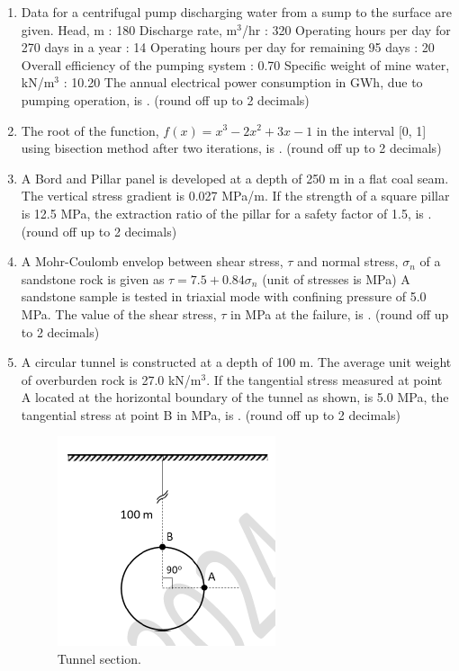 \documentclass[journal]{IEEEtran}
\begin{document}
\begin{enumerate}[leftmargin=0pt]
\hfill{}
\item Data for a centrifugal pump discharging water from a sump to the surface are given. Head, m : 180 Discharge rate, m$^3$/hr : 320 Operating hours per day for 270 days in a year : 14 Operating hours per day for remaining 95 days : 20 Overall efficiency of the pumping system : 0.70 Specific weight of mine water, kN/m$^3$ : 10.20 The annual electrical power consumption in GWh, due to pumping operation, is \underline{\hspace{1.5cm}}. (round off up to 2 decimals)
\hfill{}
\item The root of the function, $f(x) = x^3 - 2x^2 + 3x - 1$ in the interval [0, 1] using bisection method after two iterations, is \underline{\hspace{1.5cm}}. (round off up to 2 decimals)
\hfill{}
\item A Bord and Pillar panel is developed at a depth of 250 m in a flat coal seam. The vertical stress gradient is 0.027 MPa/m. If the strength of a square pillar is 12.5 MPa, the extraction ratio of the pillar for a safety factor of 1.5, is \underline{\hspace{1.5cm}}. (round off up to 2 decimals)
\hfill{}
\item A Mohr-Coulomb envelop between shear stress, $\tau$ and normal stress, $\sigma_n$ of a sandstone rock is given as $\tau = 7.5 + 0.84 \sigma_n$ (unit of stresses is MPa) A sandstone sample is tested in triaxial mode with confining pressure of 5.0 MPa. The value of the shear stress, $\tau$ in MPa at the failure, is \underline{\hspace{1.5cm}}. (round off up to 2 decimals)
\hfill{}
\item A circular tunnel is constructed at a depth of 100 m. The average unit weight of overburden rock is 27.0 kN/m$^3$. If the tangential stress measured at point A located at the horizontal boundary of the tunnel as shown, is 5.0 MPa, the tangential stress at point B in MPa, is \underline{\hspace{1.5cm}}. (round off up to 2 decimals)
\begin{figure}[H] %
  \centering
  \includegraphics[width=0.5\linewidth]{figs/circular.png}
  \caption{Tunnel section.}\label{fig:tunnel}
\end{figure}


\end{enumerate}
\end{document}
